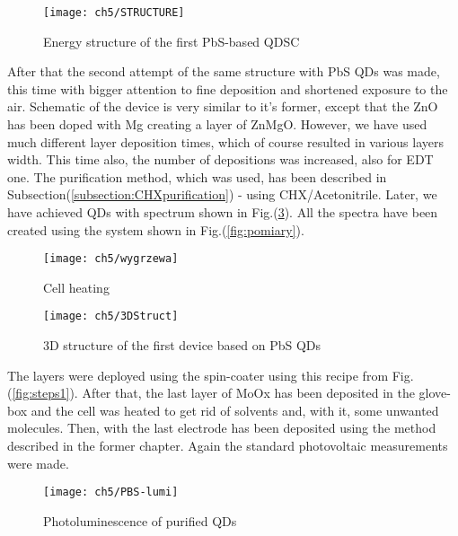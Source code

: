 \begin{figure}[H]
\center
\texttt{[image: ch5/STRUCTURE]}
\caption{Energy structure of the first PbS-based QDSC}
\label{fig:1stEnergy}
\end{figure}

After that the second attempt of the same structure with PbS QDs was made, this time with bigger attention to fine deposition and shortened exposure to the air. Schematic of the device is very similar to it's former, except that the ZnO has been doped with Mg creating a layer of ZnMgO. However, we have used much different layer deposition times, which of course resulted in various layers width. This time also, the number of depositions was increased, also for EDT one. The purification method, which was used, has been described in Subsection(\ref{subsection:CHXpurification}) - using CHX/Acetonitrile. Later, we have achieved QDs with spectrum shown in Fig.(\ref{fig:PBS}). All the spectra have been created using the system shown in Fig.(\ref{fig:pomiary}).

\begin{figure}[H]
\centering
\texttt{[image: ch5/wygrzewa]}
\caption{Cell heating}
\end{figure}

\begin{figure}
\center
\texttt{[image: ch5/3DStruct]}
\caption{3D structure of the first device based on PbS QDs}
\label{fig:1stStructure}
\end{figure}

The layers were deployed using the spin-coater using this recipe from Fig. (\ref{fig:steps1}). After that, the last layer of MoOx has been deposited in the glove-box and the cell was heated to get rid of solvents and, with it, some unwanted molecules. Then, with the last electrode has been deposited using the method described in the former chapter. Again the standard photovoltaic measurements were made.

\begin{figure}
\centering
\texttt{[image: ch5/PBS-lumi]}
\caption{Photoluminescence of purified QDs}
\label{fig:PBS}
\end{figure}

